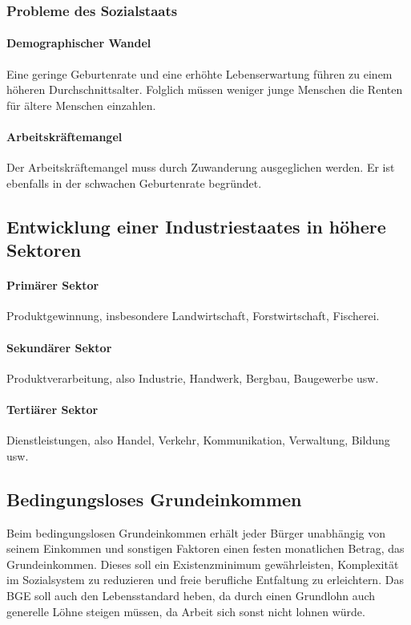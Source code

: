 \documentclass{article}
\begin{document}
	\subsubsection{Probleme des Sozialstaats}
	\paragraph{Demographischer Wandel}
	Eine geringe Geburtenrate und eine erhöhte Lebenserwartung führen zu einem höheren Durchschnittsalter. Folglich müssen weniger junge Menschen die Renten für ältere Menschen einzahlen.

	\paragraph{Arbeitskräftemangel}
	Der Arbeitskräftemangel muss durch Zuwanderung ausgeglichen werden. Er ist ebenfalls in der schwachen Geburtenrate begründet.

	\subsection{Entwicklung einer Industriestaates in höhere Sektoren}
	\paragraph{Primärer Sektor}
	Produktgewinnung, insbesondere Landwirtschaft, Forstwirtschaft, Fischerei.

	\paragraph{Sekundärer Sektor}
	Produktverarbeitung, also Industrie, Handwerk, Bergbau, Baugewerbe usw.

	\paragraph{Tertiärer Sektor}
	Dienstleistungen, also Handel, Verkehr, Kommunikation, Verwaltung, Bildung usw.

	\subsection{Bedingungsloses Grundeinkommen}
	Beim bedingungslosen Grundeinkommen erhält jeder Bürger unabhängig von seinem Einkommen und sonstigen Faktoren einen festen monatlichen Betrag, das Grundeinkommen. Dieses soll ein Existenzminimum gewährleisten, Komplexität im Sozialsystem zu reduzieren und freie berufliche Entfaltung zu erleichtern. Das BGE soll auch den Lebensstandard heben, da durch einen Grundlohn auch generelle Löhne steigen müssen, da Arbeit sich sonst nicht lohnen würde.
\end{document}

